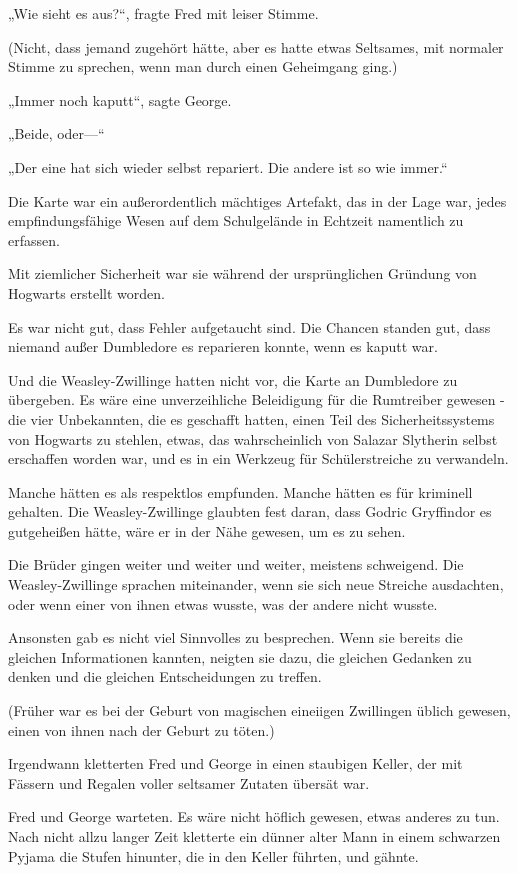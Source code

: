 {„Wie sieht es aus?“, fragte Fred mit leiser Stimme.

(Nicht, dass jemand zugehört hätte, aber es hatte etwas Seltsames, mit normaler Stimme zu sprechen, wenn man durch einen Geheimgang ging.)

„Immer noch kaputt“, sagte George.

„Beide, oder—“

„Der eine hat sich wieder selbst repariert. Die andere ist so wie immer.“

Die Karte war ein außerordentlich mächtiges Artefakt, das in der Lage war, jedes empfindungsfähige Wesen auf dem Schulgelände in Echtzeit namentlich zu erfassen.

Mit ziemlicher Sicherheit war sie während der ursprünglichen Gründung von Hogwarts erstellt worden.

Es war nicht gut, dass Fehler aufgetaucht sind. Die Chancen standen gut, dass niemand außer Dumbledore es reparieren konnte, wenn es kaputt war.

Und die Weasley-Zwillinge hatten nicht vor, die Karte an Dumbledore zu übergeben. Es wäre eine unverzeihliche Beleidigung für die Rumtreiber gewesen - die vier Unbekannten, die es geschafft hatten, einen Teil des Sicherheitssystems von Hogwarts zu stehlen, etwas, das wahrscheinlich von Salazar Slytherin selbst erschaffen worden war, und es in ein Werkzeug für Schülerstreiche zu verwandeln.

Manche hätten es als respektlos empfunden. Manche hätten es für kriminell gehalten. Die Weasley-Zwillinge glaubten fest daran, dass Godric Gryffindor es gutgeheißen hätte, wäre er in der Nähe gewesen, um es zu sehen.

Die Brüder gingen weiter und weiter und weiter, meistens schweigend. Die Weasley-Zwillinge sprachen miteinander, wenn sie sich neue Streiche ausdachten, oder wenn einer von ihnen etwas wusste, was der andere nicht wusste.

Ansonsten gab es nicht viel Sinnvolles zu besprechen. Wenn sie bereits die gleichen Informationen kannten, neigten sie dazu, die gleichen Gedanken zu denken und die gleichen Entscheidungen zu treffen.

(Früher war es bei der Geburt von magischen eineiigen Zwillingen üblich gewesen, einen von ihnen nach der Geburt zu töten.)

Irgendwann kletterten Fred und George in einen staubigen Keller, der mit Fässern und Regalen voller seltsamer Zutaten übersät war.

Fred und George warteten. Es wäre nicht höflich gewesen, etwas anderes zu tun. Nach nicht allzu langer Zeit kletterte ein dünner alter Mann in einem schwarzen Pyjama die Stufen hinunter, die in den Keller führten, und gähnte.

}
